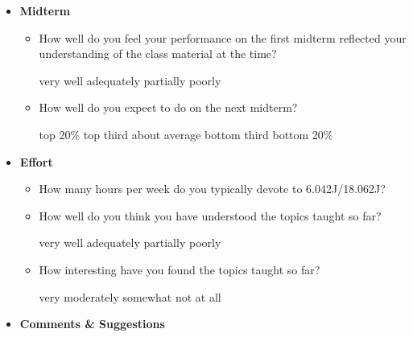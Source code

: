\documentclass[handout]{mcs}
\begin{document}
\begin{itemize}
\begin{itemize}
\end{itemize}

\item \textbf{Midterm}

\begin{itemize}

\item How well do you feel your performance on the first midterm
  reflected your understanding of the class material at the time?

\begin{center}
very well\hspace{0.3in} adequately\hspace{0.3in} partially\hspace{0.3in} poorly
\end{center}

\item How well do you expect to do on the next midterm?

\begin{center}
top 20\%\hspace{0.3in} top third \hspace{0.3in} about average\hspace{0.3in}  bottom third \hspace{0.3in} 
 bottom 20\%
\end{center}

\end{itemize}

\item \textbf{Effort}

\begin{itemize}
\item How many hours per week do you typically devote to 6.042J/18.062J?\brule{0.5in}

\item How well do you think you have understood the topics taught so
  far?

\begin{center}
very well\hspace{0.3in} adequately\hspace{0.3in} partially\hspace{0.3in} poorly
\end{center}

\item How interesting have you found the topics taught so far?

\begin{center}
very\hspace{0.3in} moderately\hspace{0.3in} somewhat \hspace{0.3in} not at all
\end{center}

\end{itemize}

\item \textbf{Comments \& Suggestions}

\end{itemize}
\end{document}
